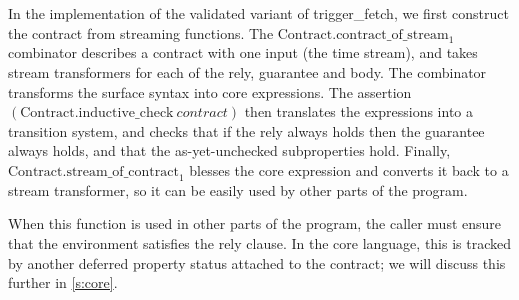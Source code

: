 In the implementation of the validated variant of trigger_fetch, we first construct the contract from streaming functions.
The $\text{Contract.contract_of_stream}_1$ combinator describes a contract with one input (the time stream), and takes stream transformers for each of the rely, guarantee and body.
The combinator transforms the surface syntax into core expressions.
The assertion $(\text{Contract.inductive_check}~\textit{contract})$ then translates the expressions into a transition system, and checks that if the rely always holds then the guarantee always holds, and that the as-yet-unchecked subproperties hold.
Finally, $\text{Contract.stream_of_contract}_1$ blesses the core expression and converts it back to a stream transformer, so it can be easily used by other parts of the program.

When this function is used in other parts of the program, the caller must ensure that the environment satisfies the rely clause.
In the core language, this is tracked by another deferred property status attached to the contract; we will discuss this further in \autoref{s:core}.






